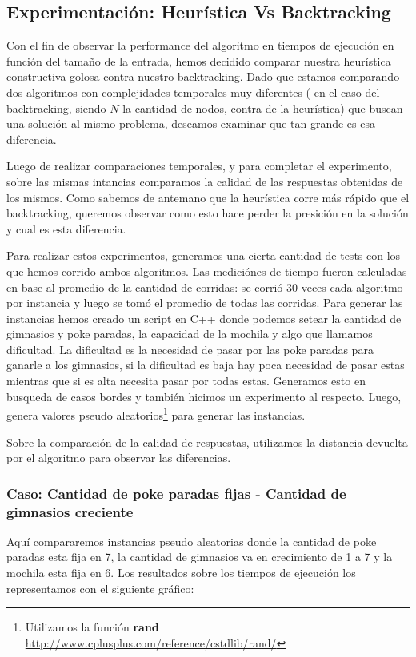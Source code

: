 \subsection{Experimentación: Heurística Vs Backtracking}
Con el fin de observar la performance del algoritmo en tiempos de ejecución en función del tamaño de la entrada, hemos decidido comparar nuestra heurística constructiva golosa contra nuestro backtracking. Dado que estamos comparando dos algoritmos con complejidades temporales muy diferentes ( en el caso del backtracking, siendo $N$ la cantidad de nodos, contra  de la heurística) que buscan una solución al mismo problema, deseamos examinar que tan grande es esa diferencia.

Luego de realizar comparaciones temporales, y para completar el experimento, sobre las mismas intancias comparamos la calidad de las respuestas obtenidas de los mismos. Como sabemos de antemano que la heurística corre más rápido que el backtracking, queremos observar como esto hace perder la presición en la solución y cual es esta diferencia.

Para realizar estos experimentos, generamos una cierta cantidad de tests con los que hemos corrido ambos algoritmos. Las mediciónes de tiempo fueron calculadas en base al promedio de la cantidad de corridas: se corrió 30 veces cada algoritmo por instancia y luego se tomó el promedio de todas las corridas. Para generar las instancias hemos creado un script en C++ donde podemos setear la cantidad de gimnasios y poke paradas, la capacidad de la mochila y algo que llamamos dificultad. La dificultad es la necesidad de pasar por las poke paradas para ganarle a los gimnasios, si la dificultad es baja hay poca necesidad de pasar estas mientras que si es alta necesita pasar por todas estas. Generamos esto en busqueda de casos bordes y también hicimos un experimento al respecto. Luego, genera valores pseudo aleatorios\footnote{Utilizamos la función \textbf{rand} \url{http://www.cplusplus.com/reference/cstdlib/rand/}} para generar las instancias.

Sobre la comparación de la calidad de respuestas, utilizamos la distancia devuelta por el algoritmo para observar las diferencias.


\subsubsection{Caso: Cantidad de poke paradas fijas - Cantidad de gimnasios creciente}
Aquí compararemos instancias pseudo aleatorias donde la cantidad de poke paradas esta fija en 7, la cantidad de gimnasios va en crecimiento de 1 a 7 y la mochila esta fija en 6.
Los resultados sobre los tiempos de ejecución los representamos con el siguiente gráfico:

